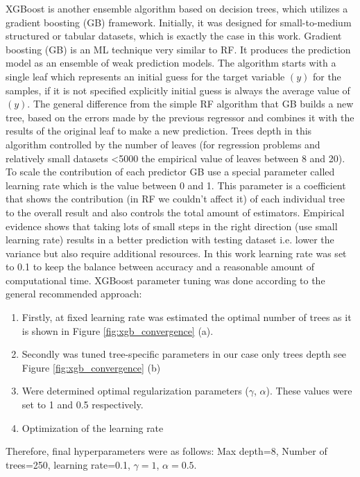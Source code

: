 XGBoost is another ensemble algorithm based on decision trees, which utilizes a gradient boosting (GB) framework. Initially, it was designed for small-to-medium structured or tabular datasets, which is exactly the case in this work.
Gradient boosting (GB) is an ML technique very similar to RF.
It produces the prediction model as an ensemble of weak prediction models. The algorithm starts with a single leaf which represents an initial guess for the target variable $(y)$ for the samples, if it is not specified explicitly initial guess is always the average value of $(y)$. The general difference from the simple RF algorithm that GB builds a new tree, based on the errors made by the previous regressor and combines it with the results of the original leaf to make a new prediction. Trees depth in this algorithm controlled by the number of leaves (for regression problems and relatively small datasets <5000 the empirical value of leaves between 8 and 20).
To scale the contribution of each predictor GB use a special parameter called learning rate which is the value between 0 and 1. This parameter is a coefficient that shows the contribution (in RF we couldn’t affect it) of each individual tree to the overall result and also controls the total amount of estimators. Empirical evidence shows that taking lots of small steps in the right direction (use small learning rate) results in a better prediction with testing dataset i.e. lower the variance but also require additional resources. In this work learning rate was set to 0.1 to keep the balance between accuracy and a reasonable amount of computational time.
XGBoost parameter tuning was done according to the general recommended approach:
\begin{enumerate}
\item Firstly, at fixed learning rate was estimated the optimal number of trees as it is shown in Figure \ref{fig:xgb_convergence} (a).
\item Secondly was tuned tree-specific parameters in our case only trees depth see Figure \ref{fig:xgb_convergence} (b)
\item Were determined optimal regularization parameters ($\gamma$, $
\alpha$). These values were set to 1 and 0.5 respectively.
\item Optimization of the learning rate
\end{enumerate}

Therefore, final hyperparameters were as follows: Max depth=8, Number of trees=250, learning rate=0.1, $\gamma=1$,
$\alpha=0.5$.

